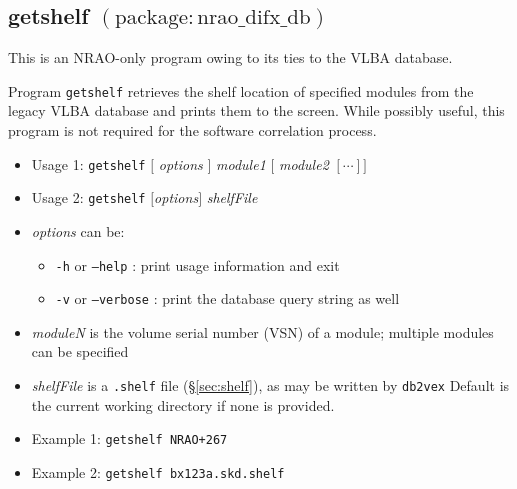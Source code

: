 






\subsection{getshelf {\small $\mathrm{(package: nrao\_difx\_db)}$}} \label{sec:getshelf}

This is an NRAO-only program owing to its ties to the VLBA database.

Program {\tt getshelf} retrieves the shelf location of specified modules from the legacy VLBA database and prints them to the screen.
While possibly useful, this program is not required for the software correlation process.

\begin{itemize}
\item[] Usage 1: {\tt getshelf} $[$ {\em options} $]$ {\em module1} $[$ {\em module2} $[ \cdots ] ]$
\item[] Usage 2: {\tt getshelf} $[${\em options}$]$ {\em shelfFile}
\item[] {\em options} can be:
\begin{itemize}
\item[] {\tt -h} or {\tt --help} : print usage information and exit
\item[] {\tt -v} or {\tt --verbose} : print the database query string as well
\end{itemize}
\item[] {\em moduleN} is the volume serial number (VSN) of a module; multiple modules can be specified
\item[] {\em shelfFile} is a {\tt .shelf} file (\S\ref{sec:shelf}), as may be written by {\tt db2vex}
Default is the current working directory if none is provided.
\item[] Example 1: {\tt getshelf NRAO+267}
\item[] Example 2: {\tt getshelf bx123a.skd.shelf}
\end{itemize}








